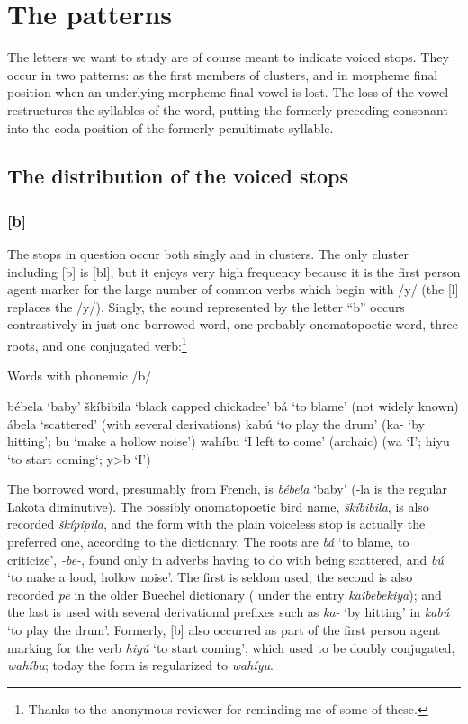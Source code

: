 \documentclass[output=paper]{LSP/langsci}
\begin{document}
\section{The patterns}

The letters we want to study are of course meant to indicate voiced stops. They occur in two patterns: as the first members of clusters, and in morpheme final position when an underlying morpheme final vowel is lost. The loss of the vowel restructures the syllables of the word, putting the formerly preceding consonant into the coda position of the formerly penultimate syllable.

\subsection{The distribution of the voiced stops}

\subsubsection{[b]}

The stops in question occur both singly and in clusters. The only cluster including [b] is [bl], but it enjoys very high frequency because it is the first person agent marker for the large number of common verbs which begin with /y/ (the [l] replaces the /y/). Singly, the sound represented by the letter ``b'' occurs contrastively in just one borrowed word, one probably onomatopoetic word, three roots, and one conjugated verb:\footnote{Thanks to the anonymous reviewer for reminding me of some of these.}

\begin{exe} 
\ex Words with phonemic /b/
\begin{xlist}
\ex b\'ebela `baby'
\ex \v{s}k\'ibibila `black capped chickadee'
\ex b\'a `to blame' (not widely known)
\ex \'abela `scattered' (with several derivations)
\ex kab\'u `to play the drum' (ka- `by hitting'; bu `make a hollow noise')
\ex wah\'ibu `I left to come' (archaic) (wa `I'; hiyu `to start coming`; y>b `I')
\end{xlist}
\end{exe}

The borrowed word, presumably from French, is \textit{b\'ebela} `baby' (-la is the regular Lakota diminutive). The possibly onomatopoetic bird name, \textit{\v{s}k\'ibibila}, is also recorded \textit{\v{s}k\'ipipila}, and the form with the plain voiceless stop is actually the preferred one, according to the dictionary. The roots are \textit{b\'a} `to blame, to criticize', \textit{-be-}, found only in adverbs having to do with being scattered, and \textit{b\'u} `to make a loud, hollow noise'. The first is seldom used; the second is also recorded \textit{pe} in the older Buechel dictionary (\citealt[278]{Buechel1970} under the entry \textit{kaibebekiya}); and the last is used with several derivational prefixes such as \textit{ka-} `by hitting' in \textit{kab\'u} `to play the drum'. Formerly, [b] also occurred as part of the first person agent marking for the verb \textit{hiy\'u} `to start coming', which used to be doubly conjugated, \textit{wah\'ibu}; today the form is regularized to \textit{wah\'iyu}.
\end{document}
